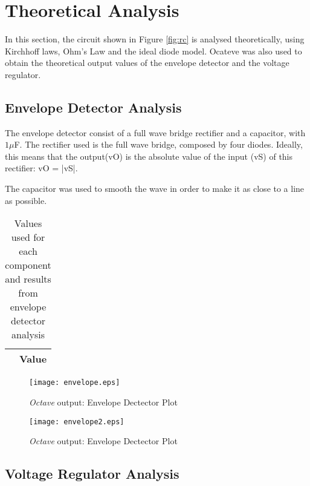 \section{Theoretical Analysis} \label{sec:analysis}

In this section, the circuit shown in Figure \ref{fig:rc} is analysed theoretically, using Kirchhoff laws, Ohm's Law and the ideal diode model.
Ocateve was also used to obtain the theoretical output values of the envelope detector and the voltage regulator. 



\subsection{Envelope Detector Analysis}

The envelope detector consist of a full wave bridge rectifier and a capacitor, with $1\mu$F.
The rectifier used is the full wave bridge, composed by four diodes. Ideally, this means that the output(vO) is the absolute value of the input (vS) of this rectifier: vO = |vS|.

The capacitor was used to smooth the wave in order to make it as close to a line as possible.

\begin{table}[h]
  \centering
  \begin{tabular}{|c|c|}
    \hline    
     & { Value } \\ \hline
    
 \end{tabular}
 \caption{Values used for each component and results from envelope detector analysis}
  \label{tab:op}
\end{table}

\begin{figure}[h]
    \centering
    \texttt{[image: envelope.eps]}
    \caption{{\it Octave} output: Envelope Dectector Plot}
    \label{fig:OctaveOut}
\end{figure}

\begin{figure}[h]
    \centering
    \texttt{[image: envelope2.eps]}
    \caption{{\it Octave} output: Envelope Dectector Plot}
    \label{fig:OctaveOut}
\end{figure}



\subsection{Voltage Regulator Analysis}

